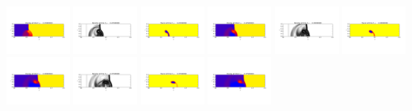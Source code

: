 \documentclass[11pt]{article}
\begin{document}
\includegraphics[width=0.158333333333\textwidth]{frame0002fig2.png}
\includegraphics[width=0.158333333333\textwidth]{frame0003fig0.png}
\includegraphics[width=0.158333333333\textwidth]{frame0003fig1.png}
\includegraphics[width=0.158333333333\textwidth]{frame0003fig2.png}
\vskip 10pt 
\includegraphics[width=0.158333333333\textwidth]{frame0004fig0.png}
\includegraphics[width=0.158333333333\textwidth]{frame0004fig1.png}
\includegraphics[width=0.158333333333\textwidth]{frame0004fig2.png}
\includegraphics[width=0.158333333333\textwidth]{frame0005fig0.png}
\includegraphics[width=0.158333333333\textwidth]{frame0005fig1.png}
\includegraphics[width=0.158333333333\textwidth]{frame0005fig2.png}
\end{document}
